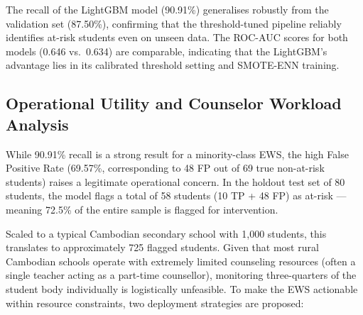 \begin{table}[htbp]
    \centering
    \caption{Holdout Test Set Performance Comparison ($N = 80$)}
    \label{tab:test_set_performance}
\end{table}

The recall of the LightGBM model (90.91\%) generalises robustly from the validation set (87.50\%), confirming that the threshold-tuned pipeline reliably identifies at-risk students even on unseen data. The ROC-AUC scores for both models (0.646 vs.\ 0.634) are comparable, indicating that the LightGBM's advantage lies in its calibrated threshold setting and SMOTE-ENN training.

\subsection{Operational Utility and Counselor Workload Analysis}
\label{subsec:operational_workload}

While 90.91\% recall is a strong result for a minority-class EWS, the high False Positive Rate (69.57\%, corresponding to 48 FP out of 69 true non-at-risk students) raises a legitimate operational concern. In the holdout test set of 80 students, the model flags a total of 58 students (10 TP + 48 FP) as at-risk --- meaning 72.5\% of the entire sample is flagged for intervention.

Scaled to a typical Cambodian secondary school with 1,000 students, this translates to approximately 725 flagged students. Given that most rural Cambodian schools operate with extremely limited counseling resources (often a single teacher acting as a part-time counsellor), monitoring three-quarters of the student body individually is logistically unfeasible. To make the EWS actionable within resource constraints, two deployment strategies are proposed:

